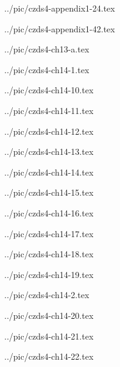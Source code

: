 

../pic/czds4-appendix1-24.tex



../pic/czds4-appendix1-42.tex



../pic/czds4-ch13-a.tex



../pic/czds4-ch14-1.tex



../pic/czds4-ch14-10.tex



../pic/czds4-ch14-11.tex



../pic/czds4-ch14-12.tex



../pic/czds4-ch14-13.tex



../pic/czds4-ch14-14.tex



../pic/czds4-ch14-15.tex



../pic/czds4-ch14-16.tex



../pic/czds4-ch14-17.tex



../pic/czds4-ch14-18.tex



../pic/czds4-ch14-19.tex



../pic/czds4-ch14-2.tex



../pic/czds4-ch14-20.tex



../pic/czds4-ch14-21.tex



../pic/czds4-ch14-22.tex



